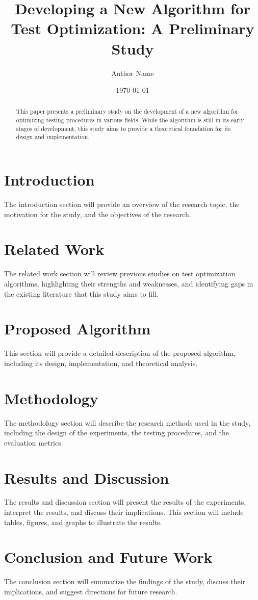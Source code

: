 \documentclass{article}
\title{Developing a New Algorithm for Test Optimization: A Preliminary Study}
\author{Author Name}
\date{\today}
\begin{document}
\maketitle

\begin{abstract}
This paper presents a preliminary study on the development of a new algorithm for optimizing testing procedures in various fields. While the algorithm is still in its early stages of development, this study aims to provide a theoretical foundation for its design and implementation.
\end{abstract}

\section{Introduction}
The introduction section will provide an overview of the research topic, the motivation for the study, and the objectives of the research.

\section{Related Work}
The related work section will review previous studies on test optimization algorithms, highlighting their strengths and weaknesses, and identifying gaps in the existing literature that this study aims to fill.

\section{Proposed Algorithm}
This section will provide a detailed description of the proposed algorithm, including its design, implementation, and theoretical analysis.

\section{Methodology}
The methodology section will describe the research methods used in the study, including the design of the experiments, the testing procedures, and the evaluation metrics.

\section{Results and Discussion}
The results and discussion section will present the results of the experiments, interpret the results, and discuss their implications. This section will include tables, figures, and graphs to illustrate the results.

\section{Conclusion and Future Work}
The conclusion section will summarize the findings of the study, discuss their implications, and suggest directions for future research.



\end{document}
